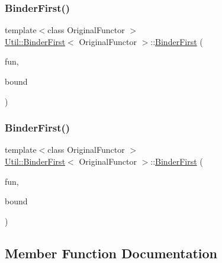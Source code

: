 \subsubsection{\texorpdfstring{BinderFirst()}{BinderFirst()}\hspace{0.1cm}{\footnotesize\ttfamily [2/3]}}
{\footnotesize\ttfamily template$<$class Original\+Functor $>$ \\
\mbox{\hyperlink{classUtil_1_1BinderFirst}{Util\+::\+Binder\+First}}$<$ Original\+Functor $>$\+::\mbox{\hyperlink{classUtil_1_1BinderFirst}{Binder\+First}} (\begin{DoxyParamCaption}\item[{const Original\+Functor \&}]{fun,  }\item[{Bound\+Type}]{bound }\end{DoxyParamCaption})\hspace{0.3cm}{\ttfamily [inline]}}

\mbox{\label{classUtil_1_1BinderFirst_a30caf0805ca9b22a13b3b79babd10054}} 
\subsubsection{\texorpdfstring{BinderFirst()}{BinderFirst()}\hspace{0.1cm}{\footnotesize\ttfamily [3/3]}}
{\footnotesize\ttfamily template$<$class Original\+Functor $>$ \\
\mbox{\hyperlink{classUtil_1_1BinderFirst}{Util\+::\+Binder\+First}}$<$ Original\+Functor $>$\+::\mbox{\hyperlink{classUtil_1_1BinderFirst}{Binder\+First}} (\begin{DoxyParamCaption}\item[{const Original\+Functor \&}]{fun,  }\item[{Bound\+Type}]{bound }\end{DoxyParamCaption})\hspace{0.3cm}{\ttfamily [inline]}}



\subsection{Member Function Documentation}
\mbox{\label{classUtil_1_1BinderFirst_aaf3277caca5fced7454825a2f2920847}} 
